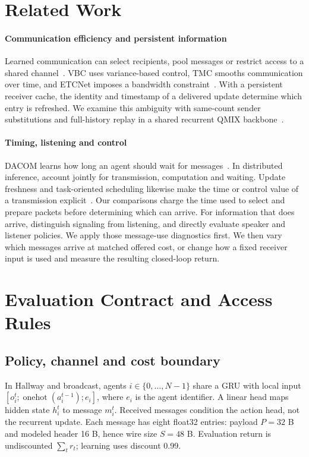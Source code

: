\documentclass[a4paper,fleqn]{cas-dc}
\begin{document}
\section{Related Work}
\paragraph{Communication efficiency and persistent information}
Learned communication can select recipients, pool messages or restrict access to a shared channel~\citep{foerster2016learning,sukhbaatar2016learning,das2019tarmac,kim2019schedule}. VBC uses variance-based control, TMC smooths communication over time, and ETCNet imposes a bandwidth constraint~\citep{zhang2019efficient,zhang2020succinct,hu2023event}. With a persistent receiver cache, the identity and timestamp of a delivered update determine which entry is refreshed. We examine this ambiguity with same-count sender substitutions and full-history replay in a shared recurrent QMIX backbone~\citep{rashid2018qmix}.

\paragraph{Timing, listening and control}
DACOM learns how long an agent should wait for messages~\citep{yuan2023dacom}. In distributed inference, \citet{jung2023splitting} account jointly for transmission, computation and waiting. Update freshness and task-oriented scheduling likewise make the time or control value of a transmission explicit~\citep{kaul2012real,ayan2022semantics}. Our comparisons charge the time used to select and prepare packets before determining which can arrive. For information that does arrive, \citet{lowe2019pitfalls} distinguish signaling from listening, and \citet{eccles2019biases} directly evaluate speaker and listener policies. We apply those message-use diagnostics first. We then vary which messages arrive at matched offered cost, or change how a fixed receiver input is used and measure the resulting closed-loop return.

\section{Evaluation Contract and Access Rules}
\subsection{Policy, channel and cost boundary}
In Hallway and broadcast, agents $i\in\{0,\ldots,N-1\}$ share a GRU with local input $[o_i^t;\operatorname{onehot}(a_i^{t-1});e_i]$, where $e_i$ is the agent identifier. A linear head maps hidden state $h_i^t$ to message $m_i^t$. Received messages condition the action head, not the recurrent update. Each message has eight float32 entries: payload $P=32$ B and modeled header 16 B, hence wire size $S=48$ B. Evaluation return is undiscounted $\sum_t r_t$; learning uses discount 0.99.
\end{document}
